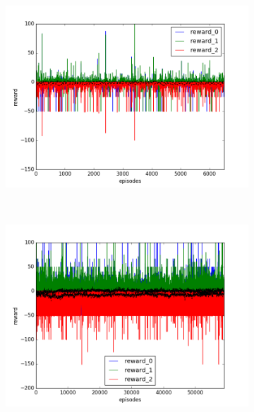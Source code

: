 \begin{figure}[t]
  \vspace{-0.5cm}
  \begin{subfigure}[t]{\figscale\linewidth}
    \hspace*{-2.75cm}
    \includegraphics[width=1.5\textwidth]
    {../results/dqn_1vs2/reward.png}
    \label{fig:dqn-1vs2-reward}
  \end{subfigure}
  ~
  \begin{subfigure}[t]{\figscale\linewidth}
    \hspace*{-1.4cm}
    \includegraphics[width=1.5\textwidth]
    {../results/ddpg_1vs2/reward.png}
    \label{fig:ddpg-1vs2-reward}
  \end{subfigure}
  ~
  \begin{subfigure}[t]{\figscale\linewidth}

\end{subfigure}
\end{figure}
